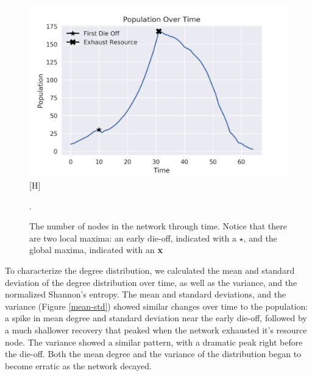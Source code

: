 \documentclass{paper}
\begin{document}
		\begin{figure}[h]
			\centering
			\includegraphics[scale=0.75]{population.png}[H]
			\caption{The number of nodes in the network through time. Notice that there are two local maxima: an early die-off, indicated with a $\star$, and the global maxima, indicated with an \textbf{\textsf{x}}}.
			\label{population}
		\end{figure}
	
	To characterize the degree distribution, we calculated the mean and standard deviation of the degree distribution over time, as well as the variance, and the normalized Shannon's entropy. The mean and standard deviations, and the variance (Figure \ref{mean-std}) showed similar changes over time to the population: a spike in mean degree and standard deviation near the early die-off, followed by a much shallower recovery that peaked when the network exhausted it's resource node. The variance showed a similar pattern, with a dramatic peak right before the die-off. Both the mean degree and the variance of the distribution began to become erratic as the network decayed. 
	
\end{document}
